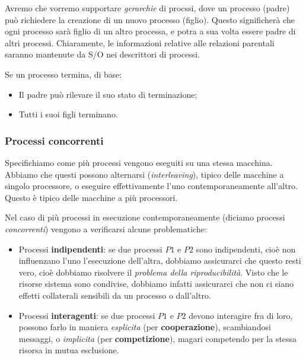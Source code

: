 \documentclass[a4paper,11pt]{article}
\begin{document}
Avremo che vorremo supportare \textit{gerarchie} di procssi, dove un processo (padre) può richiedere la creazione di un nuovo processo (figlio).
Questo significherà che ogni processo sarà figlio di un altro processa, e potra a sua volta essere padre di altri processi.
Chiaramente, le informazioni relative alle relazioni parentali saranno mantenute da S/O nei descrittori di processi.

Se un processo termina, di base:
\begin{itemize}
	\item Il padre può rilevare il suo stato di terminazione;
	\item Tutti i suoi figli terminano.
\end{itemize}

\subsubsection{Processi concorrenti}
Specifichiamo come più processi vengono eseguiti su una stessa macchina.
Abbiamo che questi possono alternarsi (\textit{interleaving}), tipico delle macchine a singolo processore, o eseguire effettivamente l'uno contemporaneamente all'altro. Questo è tipico delle macchine a più processori.

Nel caso di più processi in esecuzione contemporaneamente (diciamo processi \textit{concorrenti}) vengono a verificarsi alcune problematiche:
\begin{itemize}
	\item Processi \textbf{indipendenti}: se due processi $P1$ e $P2$ sono indipendenti, cioè non influenzano l'uno l'esecuzione dell'altra, dobbiamo assicurarci che questo resti vero, cioè dobbiamo risolvere il \textit{problema della riproducibilità}. Visto che le risorse sistema sono condivise, dobbiamo infatti assicurarci che non ci siano effetti collaterali sensibili da un processo o dall'altro.
	\item Processi \textbf{interagenti}: se due processi $P1$ e $P2$ devono interagire fra di loro, possono farlo in maniera \textit{esplicita} (per \textbf{cooperazione}), scambiandosi messaggi, o \textit{implicita} (per \textbf{competizione}), magari competendo per la stessa risorsa in mutua esclusione.
\end{itemize}
\end{document}

